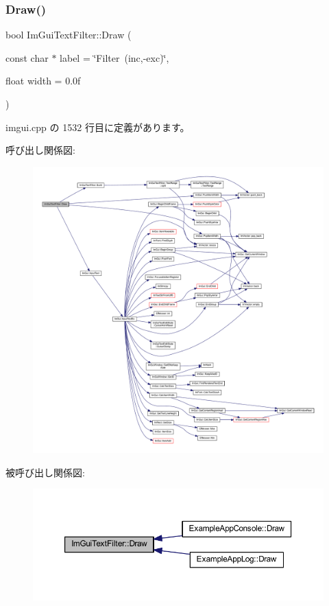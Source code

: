 \subsubsection{\texorpdfstring{Draw()}{Draw()}}
{\footnotesize\ttfamily bool Im\+Gui\+Text\+Filter\+::\+Draw (\begin{DoxyParamCaption}\item[{const char $\ast$}]{label = {\ttfamily \char`\"{}Filter~(inc,-\/exc)\char`\"{}},  }\item[{float}]{width = {\ttfamily 0.0f} }\end{DoxyParamCaption})}



 imgui.\+cpp の 1532 行目に定義があります。

呼び出し関係図\+:\nopagebreak
\begin{figure}[H]
\begin{center}
\leavevmode
\includegraphics[width=350pt]{struct_im_gui_text_filter_ab93ad5985019ff9d3781606551fc26cc_cgraph}
\end{center}
\end{figure}
被呼び出し関係図\+:\nopagebreak
\begin{figure}[H]
\begin{center}
\leavevmode
\includegraphics[width=350pt]{struct_im_gui_text_filter_ab93ad5985019ff9d3781606551fc26cc_icgraph}
\end{center}
\end{figure}
\mbox{\label{struct_im_gui_text_filter_a493158f2ab8f45fcf303c3f953be9b88}} 
